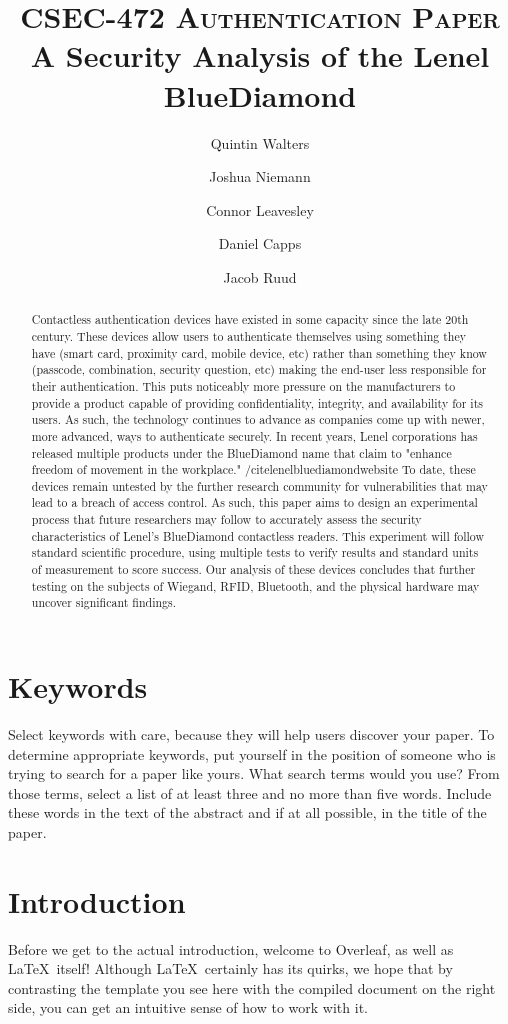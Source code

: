 \documentclass[10pt,twocolumn,letterpaper]{article}
\title{
		\vspace{-1in}
		\usefont{OT1}{bch}{b}{n}
		\normalfont \normalsize \textsc{CSEC-472 Authentication Paper} \\ [14pt]
		\huge A Security Analysis of the Lenel BlueDiamond \\
}
\author[1]{Quintin Walters}
\author[1]{Joshua Niemann}
\author[1]{Connor Leavesley}
\author[1]{Daniel Capps}
\author[1]{Jacob Ruud}
\affil[1]{\small{Computing Security, Rochester Institute of Technology}}
\begin{document}
\maketitle
{}
\begin{abstract}
Contactless authentication devices have existed in some capacity since the late 20th century. These devices allow users to authenticate themselves using something they have (smart card, proximity card, mobile device, etc) rather than something they know (passcode, combination, security question, etc) making the end-user less responsible for their authentication. This puts noticeably more pressure on the manufacturers to provide a product capable of providing confidentiality, integrity, and availability for its users. As such, the technology continues to advance as companies come up with newer, more advanced, ways to authenticate securely. In recent years, Lenel corporations has released multiple products under the BlueDiamond name that claim to "enhance freedom of movement in the workplace." /cite{lenelbluediamondwebsite} To date, these devices remain untested by the further research community for vulnerabilities that may lead to a breach of access control. As such, this paper aims to design an experimental process that future researchers may follow to accurately assess the security characteristics of Lenel's BlueDiamond contactless readers. This experiment will follow standard scientific procedure, using multiple tests to verify results and standard units of measurement to score success. Our analysis of these devices concludes that further testing on the subjects of Wiegand, RFID, Bluetooth, and the physical hardware may uncover significant findings.
\end{abstract}

\section*{Keywords}
Select keywords with care, because they will help users discover your paper. To determine appropriate keywords, put yourself in the position of someone who is trying to search for a paper like yours. What search terms would you use? From those terms, select a list of at least three and no more than five words. Include these words in the text of the abstract and if at all possible, in the title of the paper.

\section{Introduction}
Before we get to the actual introduction, welcome to Overleaf, as well as \LaTeX\ itself! Although \LaTeX\ certainly has its quirks, we hope that by contrasting the template you see here with the compiled document on the right side, you can get an intuitive sense of how to work with it.
\end{document}
